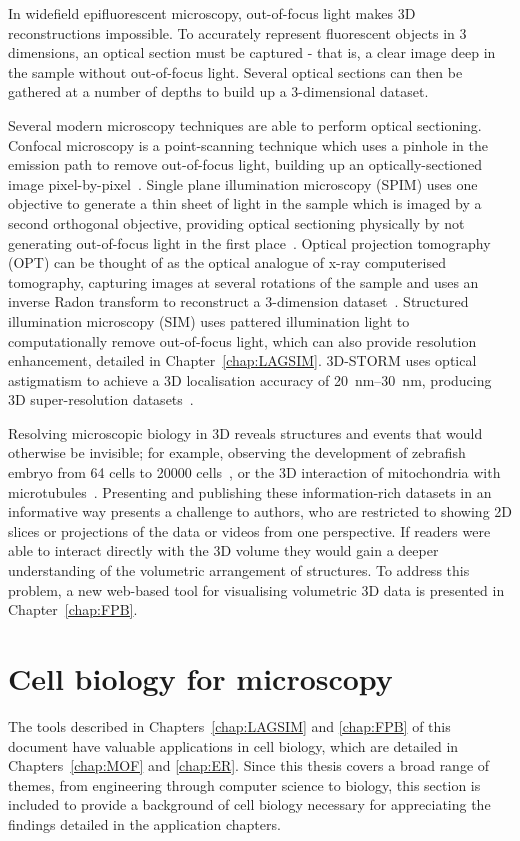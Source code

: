 In widefield epifluorescent microscopy, out-of-focus light makes 3D reconstructions impossible.
To accurately represent fluorescent objects in 3 dimensions, an optical section must be captured - that is, a clear image deep in the sample without out-of-focus light. %
Several optical sections can then be gathered at a number of depths to build up a 3-dimensional dataset. 

Several modern microscopy techniques are able to perform optical sectioning. 
Confocal microscopy is a point-scanning technique which uses a pinhole in the emission path to remove out-of-focus light, building up an optically-sectioned image pixel-by-pixel~\cite{white1987evaluation, marvin1961microscopy}. 
Single plane illumination microscopy (SPIM) uses one objective to generate a thin sheet of light in the sample which is imaged by a second orthogonal objective, providing optical sectioning physically by not generating out-of-focus light in the first place~\cite{huisken2004optical}. 
Optical projection tomography (OPT) can be thought of as the optical analogue of x-ray computerised tomography, capturing images at several rotations of the sample and uses an inverse Radon transform to reconstruct a 3-dimension dataset~\cite{sharpe2002optical}. 
Structured illumination microscopy (SIM) uses pattered illumination light to computationally remove out-of-focus light, which can also provide resolution enhancement, detailed in Chapter~\ref{chap:LAGSIM}. 
3D-STORM uses optical astigmatism to achieve a 3D localisation accuracy of \SIrange{20}{30}{\nano\metre}, producing 3D super-resolution datasets~\cite{huang2008three}. 

Resolving microscopic biology in 3D reveals structures and events that would otherwise be invisible; for example, observing the development of zebrafish embryo from 64 cells to \num{20000} cells~\cite{keller2008reconstruction}, or the 3D interaction of mitochondria with microtubules~\cite{huang2016ultra}. 
Presenting and publishing these information-rich datasets in an informative way presents a challenge to authors, who are restricted to showing 2D slices or projections of the data or videos from one perspective. 
If readers were able to interact directly with the 3D volume they  would gain a deeper understanding of the volumetric arrangement of structures. 
To address this problem, a new web-based tool for visualising volumetric 3D data is presented in Chapter~\ref{chap:FPB}. 


\section{Cell biology for microscopy}
The tools described in Chapters~\ref{chap:LAGSIM} and \ref{chap:FPB} of this document have valuable applications in cell biology, which are detailed in Chapters~\ref{chap:MOF} and \ref{chap:ER}.
Since this thesis covers a broad range of themes, from engineering through computer science to biology, this section is included to provide a background of cell biology necessary for appreciating the findings detailed in the application chapters. 

